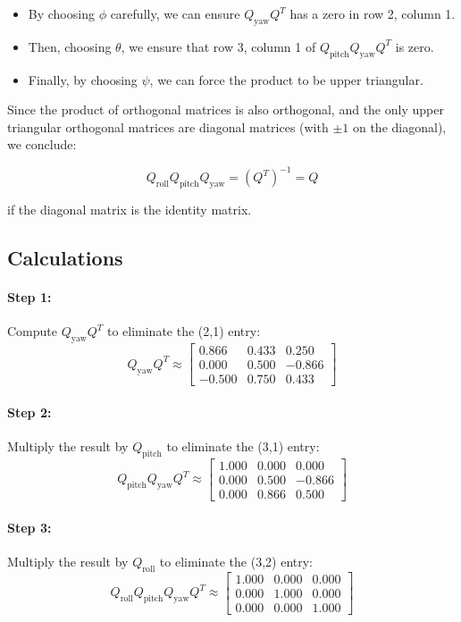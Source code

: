 \documentclass[12pt]{article}
\begin{document}
\begin{itemize}
    \item By choosing $\phi$ carefully, we can ensure $Q_{\text{yaw}} Q^T$ has a zero in row 2, column 1.
    \item Then, choosing $\theta$, we ensure that row 3, column 1 of $Q_{\text{pitch}} Q_{\text{yaw}} Q^T$ is zero.
    \item Finally, by choosing $\psi$, we can force the product to be upper triangular.
\end{itemize}

Since the product of orthogonal matrices is also orthogonal, and the only upper triangular orthogonal matrices are diagonal matrices (with $\pm 1$ on the diagonal), we conclude:

\[
Q_{\text{roll}} Q_{\text{pitch}} Q_{\text{yaw}} = (Q^T)^{-1} = Q
\]

if the diagonal matrix is the identity matrix.


\subsection*{Calculations}

\paragraph{Step 1:} Compute $Q_{\text{yaw}} Q^T$ to eliminate the (2,1) entry:
\[
Q_{\text{yaw}} Q^T \approx
\begin{bmatrix}
0.866 & 0.433 & 0.250 \\
0.000 & 0.500 & -0.866 \\
-0.500 & 0.750 & 0.433
\end{bmatrix}
\]

\paragraph{Step 2:} Multiply the result by $Q_{\text{pitch}}$ to eliminate the (3,1) entry:
\[
Q_{\text{pitch}} Q_{\text{yaw}} Q^T \approx
\begin{bmatrix}
1.000 & 0.000 & 0.000 \\
0.000 & 0.500 & -0.866 \\
0.000 & 0.866 & 0.500
\end{bmatrix}
\]

\paragraph{Step 3:} Multiply the result by $Q_{\text{roll}}$ to eliminate the (3,2) entry:
\[
Q_{\text{roll}} Q_{\text{pitch}} Q_{\text{yaw}} Q^T \approx
\begin{bmatrix}
1.000 & 0.000 & 0.000 \\
0.000 & 1.000 & 0.000 \\
0.000 & 0.000 & 1.000
\end{bmatrix}
\]
\end{document}
